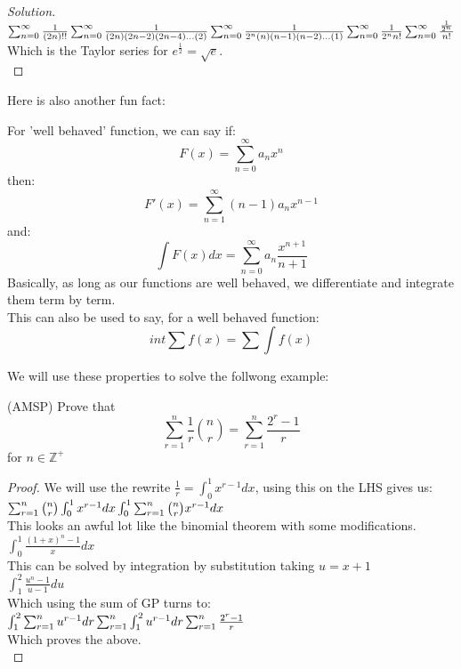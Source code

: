 \begin{proof}
    [Solution]
$\sum^{\infty}_{n=0} \frac{1}{(2n)!!}\\
\sum^{\infty}_{n=0} \frac{1}{(2n)(2n-2)(2n-4)\dots(2)}\\
\sum^{\infty}_{n=0} \frac{1}{2^n(n)(n-1)(n-2)\dots(1)}\\
\sum^{\infty}_{n=0} \frac{1}{2^n n!}\\
\sum^{\infty}_{n=0} \frac{\frac{1}{2^n}}{n!}\\
$
Which is the Taylor series for $e^{\frac{1}{2}}=\sqrt{e}$.\\
\end{proof}
Here is also another fun fact:\\
\begin{theorem}
    For 'well behaved' function, we can say if:\\
    \[F(x)=\sum^{\infty}_{n=0}a_nx^n\]
    then:\\
    \[F'(x)=\sum^{\infty}_{n=1}(n-1)a_nx^{n-1}\]
    and:\\
    \[\int F(x) dx = \sum^{\infty}_{n=0}a_n \frac{x^{n+1}}{n+1}\]
    Basically, as long as our functions are well behaved, we differentiate and integrate them term by term.\\
    This can also be used to say, for a well behaved function:\\
    \[int \sum f(x)= \sum \int f(x)\]
\end{theorem}
We will use these properties to solve the follwong example:\\
\begin{example}
(AMSP) Prove that    \[ \sum^n_{r=1} \frac{1}{r} \binom{n}{r}= \sum^n_{r=1} \frac{2^r-1}{r}\]
for $n \in \mathbb{Z^+}$
\end{example}
\begin{proof}
    We will use the rewrite $\frac{1}{r} =\int^1_0 x^{r-1} dx$, using this on the LHS gives us:\\
    $
    \sum^n_{r=1} \binom{n}{r} \int^1_0 x^{r-1} dx\\
    \int^1_0 \sum^n_{r=1}  \binom{n}{r} x^{r-1} dx$\\
    This looks an awful lot like the binomial theorem with some modifications.\\
    $\int^1_0 \frac{(1+x)^n-1}{x} dx$\\
    This can be solved by integration by substitution taking $u=x+1$\\
    $\int^2_1 \frac{u^n-1}{u-1} du$\\
    Which using the sum of GP turns to:\\
    $\int^2_1 \sum^n_{r=1}u^{r-1} dr\\
    \sum^n_{r=1} \int^2_1 u^{r-1} dr\\
    \sum^n_{r=1} \frac{2^r-1}{r}$\\
    Which proves the above.\\
\end{proof}

